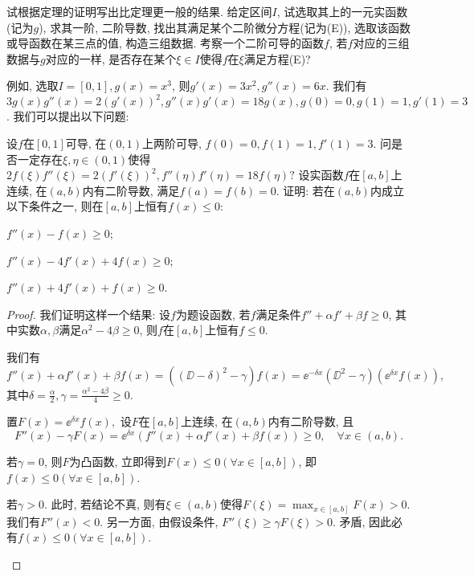 \begin{quizb}
\woe 试根据定理的证明写出比定理更一般的结果.
\woe 给定区间\(I\), 试选取其上的一元实函数(记为\(g\)), 求其一阶, 二阶导数, 找出其满足某个二阶微分方程(记为(E)), 选取该函数或导函数在某三点的值, 构造三组数据. 考察一个二阶可导的函数\(f\), 若\(f\)对应的三组数据与\(g\)对应的一样, 是否存在某个\(\xi\in I\)使得\(f\)在\(\xi\)满足方程(E)?

例如, 选取\(I=[0,1],g(x)=x^3\), 则\(g'(x)=3x^2,g''(x)=6x\). 我们有\(3g(x)g''(x)=2\left(g'(x)\right)^2,g''(x)g'(x)=18g(x),g(0)=0,g(1)=1,g'(1)=3\). 我们可以提出以下问题: 

设\(f\)在\([0,1]\)可导, 在\((0,1)\)上两阶可导, \(f(0)=0,f(1)=1,f'(1)=3\). 问是否一定存在\(\xi,\eta\in(0,1)\)使得\(2f(\xi)f''(\xi)=2\left(f'(\xi)\right)^2,f''(\eta)f'(\eta)=18f(\eta)?\)
\woe 设实函数\(f\)在\([a,b]\)上连续, 在\((a,b)\)内有二阶导数, 满足\(f(a)=f(b)=0\). 证明: 若在\((a,b)\)内成立以下条件之一, 则在\([a,b]\)上恒有\(f(x)\leqslant 0\):\begin{quizcs}
\item \(f''(x)-f(x)\geqslant 0\);
\item \(f''(x)-4f'(x)+4f(x)\geqslant 0\);
\item \(f''(x)+4f'(x)+f(x)\geqslant 0\).
\end{quizcs}
\begin{proof}
我们证明这样一个结果: 设\(f\)为题设函数, 若\(f\)满足条件\(f''+\alpha f'+\beta f\geqslant 0\), 其中实数\(\alpha,\beta\)满足\(\alpha^2-4\beta\geqslant 0\), 则\(f\)在\([a,b]\)上恒有\(f\leqslant 0\).

我们有\[f''(x)+\alpha f'(x)+\beta f(x)=\left((\DD-\delta)^2-\gamma\right)f(x)=\ee^{-\delta x}(\DD^2-\gamma)\left(\ee^{\delta x}f(x)\right),\]其中\(\delta=\frac{\alpha}{2},\gamma=\frac{\alpha^2-4\beta}{4}\geqslant 0\).

置\(F(x)=\ee^{\delta x}f(x),\) 设\(F\)在\([a,b]\)上连续, 在\((a,b)\)内有二阶导数, 且\[F''(x)-\gamma F(x)=\ee^{\delta x}\left(f''(x)+\alpha f'(x)+\beta f(x)\right)\geqslant 0,\quad \forall x\in(a,b).\]
\begin{asparaenum}[(i)]
\item 若\(\gamma=0\), 则\(F\)为凸函数, 立即得到\(F(x)\leqslant 0(\forall x\in[a,b])\), 即\(f(x)\leqslant 0(\forall x\in[a,b])\).
\item 若\(\gamma>0\). 此时, 若结论不真, 则有\(\xi\in(a,b)\)使得\(F(\xi)=\max_{x\in[a,b]}F(x)>0\). 我们有\(F''(x)<0\). 另一方面, 由假设条件, \(F''(\xi)\geqslant\gamma F(\xi)>0\). 矛盾, 因此必有\(f(x)\leqslant 0(\forall x\in[a,b])\).
\end{asparaenum}


\end{proof}
\end{quizb}
